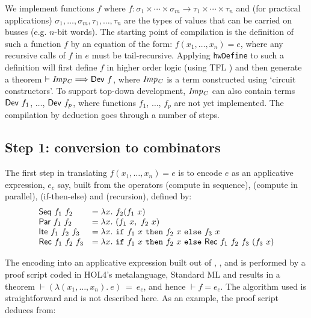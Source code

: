 We implement functions $f$ where
$
f : \sigma_1\times\cdots\times\sigma_m \rightarrow \tau_1\times\cdots\times\tau_n
$
and (for practical applications) $\sigma_1,\ldots,\sigma_m,\tau_1,\ldots,\tau_n$ are the types of
values that can be carried on busses (e.g. $n$-bit words).
The starting point of compilation is the definition of such a function $f$ by an equation of
the form: $f(x_1,\ldots,x_n)=e$, where any recursive calls of $f$ in
$e$ must be tail-recursive. Applying \texttt{hwDefine} to such a
definition will first define $f$ in higher order logic (using TFL
\cite{slind:wfrec})  and then generate a theorem $\vdash {\it{Imp_C}}
\Longrightarrow \mathsf{Dev}~f$, where ${\it{Imp_C}}$ is a term
constructed using `circuit constructors'.
To support top-down development, ${\it{Imp_C}}$ can also contain terms
$\mathsf{Dev}~f_1$, $\ldots$, $\mathsf{Dev}~f_p$, where functions $f_1$,
$\ldots$, $f_p$ are not yet implemented. The compilation by deduction
goes through a number of steps.

\subsection*{Step 1: conversion to combinators}

The first step in translating $f(x_1,\ldots,x_n)=e$ is to encode $e$
as an applicative expression, $e_c$ say, built from the operators 
(compute in sequence),
 (compute in parallel),  (if-then-else) and  (recursion), defined by:
\[
\begin{array}{ll}
\mathsf{Seq}~f_1~f_2     &   = \lambda x.~f_2(f_1~x)\\
\mathsf{Par}~f_1~f_2     &   = \lambda x.~(f_1~x,~f_2~x)\\
\mathsf{Ite}~f_1~f_2~f_3 &   = \lambda x.~ \texttt{if}~f_1~x~\texttt{then}~f_2~x~\texttt{else}~f_3~x\\
\mathsf{Rec}~f_1~f_2~f_3 &   = \lambda x.~\texttt{if}~f_1~x~\texttt{then}~f_2~x~\texttt{else}~\mathsf{Rec}~f_1~f_2~f_3~(f_3~x)\\
\end{array}
\]

The encoding into an applicative expression built out of ,
,  and  is performed by a proof script
coded in HOL4's metalanguage, Standard ML and results in a theorem $\vdash (\lambda(x_1,\ldots,x_n).~e)~=~e_c$,
and hence $\vdash f=e_c$.
The algorithm used is straightforward
and is not described here. As an example, the proof script deduces
from:

